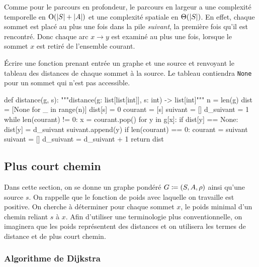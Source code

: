 \documentclass{magnolia}
\begin{document}
Comme pour le parcours en profondeur, le parcours en largeur a une complexité temporelle
en ${\rm O}(\left|S\right|+\left|A\right|)$ et une complexité spatiale en $\Theta(\left|S\right|)$. 
En effet, chaque
sommet est placé au plus une fois dans la pile \emph{suivant}, la première fois qu'il est
rencontré.  Donc chaque arc
$x\to y$ est examiné au plus une fois, lorsque le sommet $x$ est retiré de l'ensemble
courant.
\vspace{2ex}
\begin{exoUnique}
\exo Écrire une fonction prenant entrée un graphe et une source et renvoyant le
  tableau des distances de chaque sommet à la source. Le tableau contiendra \verb!None!
  pour un sommet qui n'est pas accessible.
  \begin{sol}
\begin{pythoncodeline}
def distance(g, s):
    """distance(g: list[list[int]], s: int) -> list[int]"""
    n = len(g)
    dist = [None for _ in range(n)]
    dist[s] = 0
    courant = [s]
    suivant = []
    d_suivant = 1
    while len(courant) != 0:
        x = courant.pop()
        for y in g[x]:
            if dist[y] == None:
                dist[y] = d_suivant
                suivant.append(y)
        if len(courant) == 0:
            courant = suivant
            suivant = []
            d_suivant = d_suivant + 1
    return dist
\end{pythoncodeline}
  \end{sol}
\end{exoUnique}

\subsection{Plus court chemin}

Dans cette section, on se donne un graphe pondéré $G\coloneqq(S,A,\rho)$ ainsi qu'une source
$s$. On rappelle que le fonction de poids avec laquelle on travaille est positive.
On cherche à déterminer pour chaque sommet $x$, le poids minimal d'un chemin reliant $s$
à $x$. Afin d'utiliser une terminologie plus conventionnelle, on imaginera que les poids représentent des
distances et on utilisera les termes de distance et de plus court chemin.

\subsubsection{Algorithme de Dijkstra}
\end{document}
